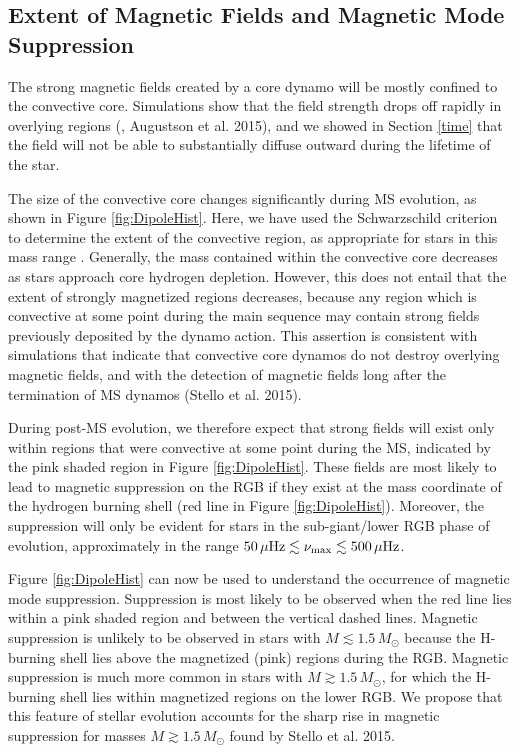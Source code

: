 \subsection{Extent of Magnetic Fields and Magnetic Mode Suppression}
\label{rgb}

The strong magnetic fields created by a core dynamo will be mostly confined to the convective core. Simulations show that the field strength drops off rapidly in overlying regions (\citealt{Featherstone_2009}, Augustson et al. 2015), and we showed in Section \ref{time} that the field will not be able to substantially diffuse outward during the lifetime of the star. 

The size of the convective core changes significantly during MS evolution, as shown in Figure \ref{fig:DipoleHist}. Here, we have used the Schwarzschild criterion to determine the extent of the convective region, as appropriate for stars in this mass range \cite{Moore_2015}. Generally, the mass contained within the convective core decreases as stars approach core hydrogen depletion. However, this does not entail that the extent of strongly magnetized regions decreases, because any region which is convective at some point during the main sequence may contain strong fields previously deposited by the dynamo action. This assertion is consistent with simulations \citep{Featherstone_2009} that indicate that convective core dynamos do not destroy overlying magnetic fields, and with the detection of magnetic fields long after the termination of MS dynamos (Stello et al. 2015).

During post-MS evolution, we therefore expect that strong fields will exist only within regions that were convective at some point during the MS, indicated by the pink shaded region in Figure \ref{fig:DipoleHist}. These fields are most likely to lead to magnetic suppression on the RGB if they exist at the mass coordinate of the hydrogen burning shell (red line in Figure \ref{fig:DipoleHist}). Moreover, the suppression will only be evident for stars in the sub-giant/lower RGB phase of evolution, approximately in the range $50 \, \mu {\rm Hz} \lesssim \nu_{\rm max} \lesssim 500 \, \mu {\rm Hz}$.

Figure \ref{fig:DipoleHist} can now be used to understand the occurrence of magnetic mode suppression. Suppression is most likely to be observed when the red line lies within a pink shaded region and between the vertical dashed lines. Magnetic suppression is unlikely to be observed in stars with $M \lesssim 1.5 \, M_\odot$ because the H-burning shell lies above the magnetized (pink) regions during the RGB. Magnetic suppression is much more common in stars with $M \gtrsim 1.5 \, M_\odot$, for which the H-burning shell lies within magnetized regions on the lower RGB. We propose that this feature of stellar evolution accounts for the sharp rise in magnetic suppression for masses $M \gtrsim 1.5 \, M_\odot$ found by Stello et al. 2015.

    
    
  
  